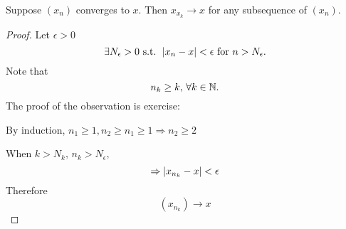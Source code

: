 \documentclass[a4paper,12pt]{article}
\begin{document}
    \begin{theorem}
        Suppose \((x_n)\) converges to \(x\). Then \(x_{x_k}\rightarrow x\) for any subsequence of \((x_n)\).
    \end{theorem}
    \begin{proof}
        Let \(\epsilon > 0\)
        \[\exists N_\epsilon >0 \text{ s.t. } \left\lvert x_n-x\right\rvert < \epsilon \text{ for }n>N_\epsilon.\]
        Note that \[n_k \ge k,\,\forall k \in \mathbb{N} .\]
        The proof of the observation is exercise:
        \begin{exercise}
            By induction, \(n_1\ge 1, n_2 \ge n_1 \ge 1 \Rightarrow n_2 \ge 2\)
        \end{exercise}
        When \(k>N_k,\, n_k>N_\epsilon,\)
        \[\Rightarrow\left\lvert x_{n_k}-x\right\rvert<\epsilon\]
        Therefore\[(x_{n_k})\rightarrow x\]
    \end{proof}
\end{document}
